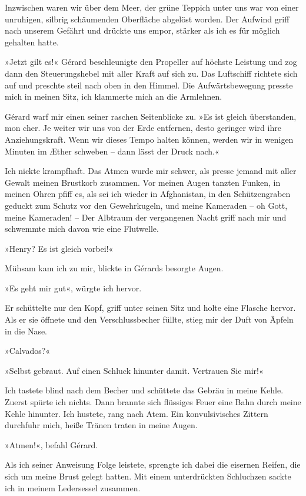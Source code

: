 Inzwischen waren wir über dem Meer, der grüne Teppich unter uns war
von einer unruhigen, silbrig schäumenden Oberfläche abgelöst
worden. Der Aufwind griff nach unserem Gefährt und drückte uns
empor, stärker als ich es für möglich gehalten hatte.

»Jetzt gilt es!« Gérard beschleunigte den Propeller auf höchste
Leistung und zog dann den Steuerungshebel mit aller Kraft auf sich
zu. Das Luftschiff richtete sich auf und preschte steil nach oben
in den Himmel. Die Aufwärtsbewegung presste mich in meinen Sitz,
ich klammerte mich an die Armlehnen.

Gérard warf mir einen seiner raschen Seitenblicke zu. »Es ist
gleich überstanden, mon cher. Je weiter wir uns von der Erde
entfernen, desto geringer wird ihre Anziehungskraft. Wenn wir
dieses Tempo halten können, werden wir in wenigen Minuten im Æther
schweben – dann lässt der Druck nach.«

Ich nickte krampfhaft. Das Atmen wurde mir schwer, als presse
jemand mit aller Gewalt meinen Brustkorb zusammen. Vor meinen Augen
tanzten Funken, in meinen Ohren pfiff es, als sei ich wieder in
Afghanistan, in den Schützengraben geduckt zum Schutz vor den
Gewehrkugeln, und meine Kameraden – oh Gott, meine Kameraden! – Der
Albtraum der vergangenen Nacht griff nach mir und schwemmte mich
davon wie eine Flutwelle.

»Henry? Es ist gleich vorbei!«

Mühsam kam ich zu mir, blickte in Gérards besorgte Augen.

»Es geht mir gut«, würgte ich hervor.

Er schüttelte nur den Kopf, griff unter seinen Sitz und holte eine
Flasche hervor. Als er sie öffnete und den Verschlussbecher füllte,
stieg mir der Duft von Äpfeln in die Nase.

»Calvados?«

»Selbst gebraut. Auf einen Schluck hinunter damit. Vertrauen Sie
mir!«

Ich tastete blind nach dem Becher und schüttete das Gebräu in meine
Kehle. Zuerst spürte ich nichts. Dann brannte sich flüssiges Feuer
eine Bahn durch meine Kehle hinunter. Ich hustete, rang nach Atem.
Ein konvulsivisches Zittern durchfuhr mich, heiße Tränen traten in
meine Augen.

»Atmen!«, befahl Gérard.

Als ich seiner Anweisung Folge leistete, sprengte ich dabei die
eisernen Reifen, die sich um meine Brust gelegt hatten. Mit einem
unterdrückten Schluchzen sackte ich in meinem Ledersessel
zusammen.

